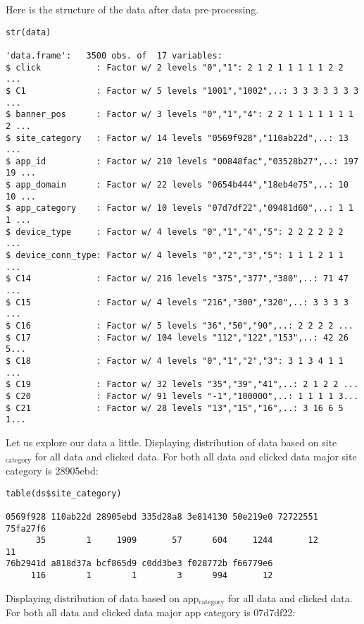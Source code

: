 \documentclass[11pt,a4paper]{article}
\begin{document}
Here is the structure of the data after data pre-processing.

\begin{verbatim}
str(data)

'data.frame':   3500 obs. of  17 variables:
$ click           : Factor w/ 2 levels "0","1": 2 1 2 1 1 1 1 1 2 2 ...
$ C1              : Factor w/ 5 levels "1001","1002",..: 3 3 3 3 3 3 3 ...
$ banner_pos      : Factor w/ 3 levels "0","1","4": 2 2 1 1 1 1 1 1 1 2 ...
$ site_category   : Factor w/ 14 levels "0569f928","110ab22d",..: 13 ...
$ app_id          : Factor w/ 210 levels "00848fac","03528b27",..: 197 19 ...
$ app_domain      : Factor w/ 22 levels "0654b444","18eb4e75",..: 10 10 ...
$ app_category    : Factor w/ 10 levels "07d7df22","09481d60",..: 1 1 1 ...
$ device_type     : Factor w/ 4 levels "0","1","4","5": 2 2 2 2 2 2 ...
$ device_conn_type: Factor w/ 4 levels "0","2","3","5": 1 1 1 2 1 1 ...
$ C14             : Factor w/ 216 levels "375","377","380",..: 71 47 ...
$ C15             : Factor w/ 4 levels "216","300","320",..: 3 3 3 3 ...
$ C16             : Factor w/ 5 levels "36","50","90",..: 2 2 2 2 ...
$ C17             : Factor w/ 104 levels "112","122","153",..: 42 26 5...
$ C18             : Factor w/ 4 levels "0","1","2","3": 3 1 3 4 1 1 ...
$ C19             : Factor w/ 32 levels "35","39","41",..: 2 1 2 2 ...
$ C20             : Factor w/ 91 levels "-1","100000",..: 1 1 1 1 3...
$ C21             : Factor w/ 28 levels "13","15","16",..: 3 16 6 5 1...
\end{verbatim}

Let us explore our data a little.
Displaying distribution of data based on site$_{\text{category}}$ for all data and clicked data. 
For both all data and clicked data major site category is 28905ebd:

\begin{verbatim}
table(ds$site_category)

0569f928 110ab22d 28905ebd 335d28a8 3e814130 50e219e0 72722551 75fa27f6 
      35        1     1909       57      604     1244       12       11 
76b2941d a818d37a bcf865d9 c0dd3be3 f028772b f66779e6 
     116        1        1        3      994       12
\end{verbatim}

Displaying distribution of data based on app$_{\text{category}}$ for all data and clicked data. For both all data and clicked data major app category is 07d7df22:
\end{document}
